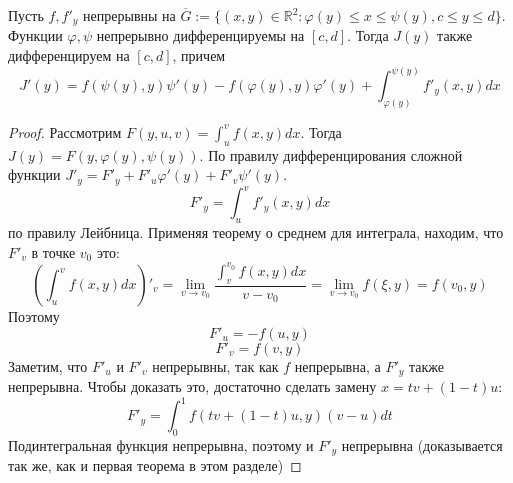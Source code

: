 \documentclass[document.tex]{subfiles}
\begin{document}
\begin{theorem}
    Пусть $f, f'_y$ непрерывны на
    $\overline G := \{(x, y) \in \mathbb{R}^2 : \varphi(y) \leq x \leq \psi(y), c \leq y \leq d\}$.
    Функции $\varphi, \psi$ непрерывно дифференцируемы на $[c, d]$. Тогда $J(y)$ также дифференцируем на $[c, d]$,
    причем
    \[
        J'(y) = f(\psi(y), y)\psi'(y) - f(\varphi(y), y) \varphi'(y) + \int_{\varphi(y)}^{\psi(y)}f'_y(x, y)dx
    \]

\end{theorem}

\begin{proof}
    Рассмотрим $F(y, u, v) = \int_{u}^{v}f(x, y) dx$. Тогда $J(y) = F(y, \varphi(y), \psi(y))$. По правилу
    дифференцирования сложной функции $J'_y = F'_y + F'_u \varphi'(y) + F'_v \psi'(y)$.
    \[
        F'_y = \int_{u}^{v}f'_y(x, y)dx
    \] по правилу Лейбница. Применяя теорему о среднем для интеграла, находим, что $F'_v$  в точке $v_0$ это:
    \[
        \left( \int_{u}^{v}f(x, y)dx \right)'_v = \lim_{v \rightarrow v_0} \frac{\int_{v}^{v_0}f(x, y)dx}{v - v_0} =
        \lim_{v \rightarrow v_0} f(\xi, y) = f(v_0, y)
    \]
    Поэтому
    \[
        F'_u = -f(u, y)
    \]
    \[
        F'_v = f(v, y)
    \] Заметим, что $F'_u$ и $F'_v$ непрерывны, так как $f$ непрерывна, а $F'_y$ также непрерывна. Чтобы доказать это,
    достаточно сделать замену $x = t v + (1 - t)u$:
    \[
        F'_y = \int_{0}^{1}f(tv + (1 - t)u, y)(v - u) dt
    \]
    Подинтегральная функция непрерывна, поэтому и $F'_y$ непрерывна (доказывается так же, как и первая теорема в этом
    разделе)
\end{proof}
\end{document}

